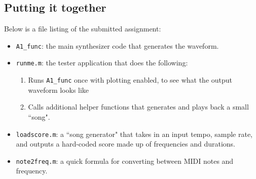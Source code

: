 \documentclass[12pt]{article}
\begin{document}
\subsection*{Putting it together}
Below is a file listing of the submitted assignment:
\begin{itemize}
\item \verb|A1_func|: the main synthesizer code that generates the waveform.
\item \verb|runme.m|: the tester application that does the following:
\begin{enumerate}
	\item 	Runs \verb|A1_func| once with plotting enabled, to see what the output waveform looks like
	\item Calls additional helper functions that generates and plays back a small ``song".
\end{enumerate}
\item \verb|loadscore.m|: a ``song generator" that takes in an input tempo, sample rate, and outputs a hard-coded score made up of frequencies and durations.
\item \verb|note2freq.m|: a quick formula for converting between MIDI notes and frequency.
\end{itemize}

\newpage
\end{document}
